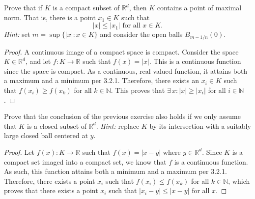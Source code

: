 \documentclass[12pt]{book}
\newcommand{\N}{\mathbb{N}}
\newcommand{\R}{\mathbb{R}}
\newenvironment{exercise}[2][Exercise]{\begin{trivlist}
\item[\hskip \labelsep {\bfseries #1}\hskip \labelsep {\bfseries #2.}]}{\end{trivlist}}
\begin{document}
\begin{exercise}{7.4.4}
Prove that if $K$ is a compact subset of $\R^d$, then $K$ contains a point of maximal norm. That is, there is a point $x_1 \in K$ such that 
    \[ |x| \leq |x_1| \text{ for all } x \in K. \]
\emph{Hint:} set $m =\sup\{ |x| : x \in K \}$  and consider the open balls $B_{m-1/n}(0)$.
    
    \begin{proof}
    A continuous image of a compact space is compact. Consider the space $K \in \R^d$, and let $f:K \to \R$ such that $f(x)=|x|$. This is a continuous function since the space is compact. As a continuous, real valued function, it attains both a maximum and a minimum per 3.2.1. Therefore, there exists an $x_i \in K$ such that $f(x_i) \geq f(x_k)$ for all $k \in \N$. This proves that $\exists \,x : |x| \geq |x_i|$ for all $i \in \N$.
    \end{proof}
\end{exercise}




\begin{exercise}{7.4.6}
Prove that the conclusion of the previous exercise also holds if we only assume that $K$ is a closed subset of $\R^d$. \emph{Hint:} replace $K$ by its intersection with a suitably large closed ball centered at $y$.

    \begin{proof}
    Let $f(x): K \to \R$ such that $f(x) = |x-y|$ where $y \in \R^d$. Since $K$ is a compact set imaged into a compact set, we know that $f$ is a continuous function. As such, this function attains both a minimum and a maximum per 3.2.1. Therefore, there exists a point $x_i$ such that $f(x_i) \leq f(x_k)$ for all $k \in \N$, which proves that there exists a point $x_i$ such that $\left| x_i - y \right| \leq \left| x- y \right| $ for all $x$.
    \end{proof}
\end{exercise}
\end{document}
